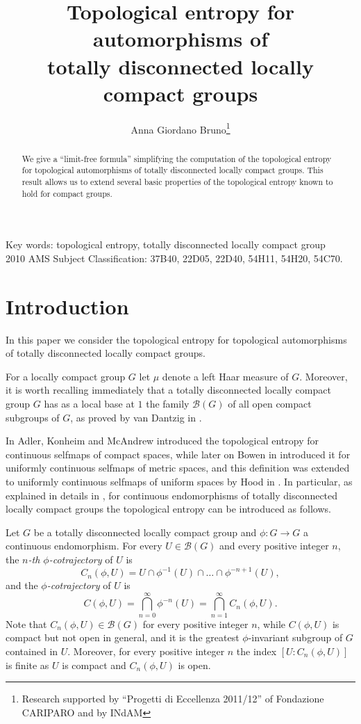\documentclass[11pt]{article}
\title{Topological entropy for automorphisms of\\totally disconnected locally compact groups}
\author{Anna Giordano Bruno\footnote{Research supported by ``Progetti di Eccellenza 2011/12'' of Fondazione CARIPARO and by INdAM}}
\theoremstyle{definition}
\numberwithin{equation}{section}
\begin{document}
\maketitle

\begin{abstract}
We give a ``limit-free formula'' simplifying the computation of the topological entropy for topological automorphisms of totally disconnected locally compact groups. This result allows us to extend several basic properties of the topological entropy known to hold for compact groups.
\end{abstract}

\bigskip
\noindent \textrm{\small{Key words: topological entropy, totally disconnected locally compact group\\
2010 AMS Subject Classification: 37B40, 22D05, 22D40, 54H11, 54H20, 54C70.}}


\section{Introduction}

In this paper we consider the topological entropy for topological automorphisms of totally disconnected locally compact groups. 

For a locally compact group $G$ let $\mu$ denote a left Haar measure of $G$. Moreover, it is worth recalling immediately that a totally disconnected locally compact group $G$ has as a local base at $1$ the family $\mathcal B(G)$ of all open compact subgroups of $G$, as proved by van Dantzig in \cite{vD}.

\medskip
In \cite{AKM} Adler, Konheim and McAndrew introduced the topological entropy for continuous selfmaps of compact spaces, while later on Bowen in \cite{B} introduced it for uniformly continuous selfmaps of metric spaces, and this definition was extended to uniformly continuous selfmaps of uniform spaces by Hood in \cite{hood}. In particular, as explained in details in \cite{DG-islam}, for continuous endomorphisms of totally disconnected locally compact groups the topological entropy can be introduced as follows. 

Let $G$ be a totally disconnected locally compact group and $\phi:G\to G$ a continuous endomorphism. For every $U\in\mathcal B(G)$ and every positive integer $n$, the \emph{$n$-th $\phi$-cotrajectory} of $U$ is $$C_n(\phi,U)=U\cap \phi^{-1}(U)\cap\ldots\cap\phi^{-n+1}(U),$$ and the \emph{$\phi$-cotrajectory} of $U$ is
$$C(\phi,U)=\bigcap_{n=0}^\infty\phi^{-n}(U)=\bigcap_{n=1}^\infty C_n(\phi,U).$$
Note that $C_n(\phi,U)\in\mathcal B(G)$ for every positive integer $n$, while $C(\phi,U)$ is compact but not open in general, and it is the greatest $\phi$-invariant subgroup of $G$ contained in $U$. Moreover, for every positive integer $n$ the index $[U:C_n(\phi,U)]$ is finite as $U$ is compact and $C_n(\phi,U)$ is open.
\end{document}
